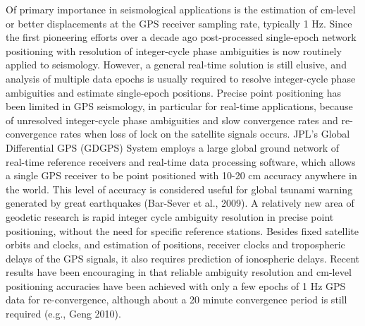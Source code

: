 Of primary importance in seismological applications is the estimation of cm-level or better displacements at the GPS receiver sampling rate, typically 1 Hz. Since the first pioneering efforts over a decade ago \citep{Nikolaidis2001,Larson2003,Bock2004,Miyazaki2004} post-processed single-epoch network positioning with resolution of integer-cycle phase ambiguities is now routinely applied to seismology.  However, a general real-time solution is still elusive, and analysis of multiple data epochs is usually required to resolve integer-cycle phase ambiguities and estimate single-epoch positions.
Precise point positioning has been limited in GPS seismology, in particular for real-time applications, because of unresolved integer-cycle phase ambiguities and slow convergence rates and re-convergence rates when loss of lock on the satellite signals occurs. JPL’s Global Differential GPS (GDGPS) System employs a large global ground network of real-time reference receivers and real-time data processing software, which allows a single GPS receiver to be point positioned with 10-20 cm accuracy anywhere in the world. This level of accuracy is considered useful for global tsunami warning generated by great earthquakes (Bar-Sever et al., 2009). A relatively new area of geodetic research is rapid integer cycle ambiguity resolution in precise point positioning, without the need for specific reference stations. Besides fixed satellite orbits and clocks, and estimation of positions, receiver clocks and tropospheric delays of the GPS signals, it also requires prediction of ionospheric delays. Recent results have been encouraging in that reliable ambiguity resolution and cm-level positioning accuracies have been achieved with only a few epochs of 1 Hz GPS data for re-convergence, although about a 20 minute convergence period is still required (e.g., Geng 2010).




